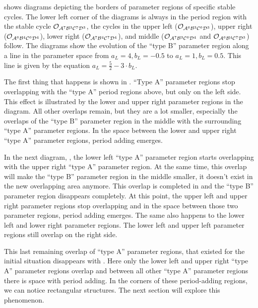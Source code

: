  shows diagrams depicting the borders of parameter regions of specific stable cycles.
The lower left corner of the diagrams is always in the period region with the stable cycle $\mathcal{O}_{\mathcal{A}^7\mathcal{B}^3\mathcal{C}^7\mathcal{D}^3}$, the cycles in the upper left ($\mathcal{O}_{\mathcal{A}^6\mathcal{B}^3\mathcal{C}^6\mathcal{D}^3}$), upper right ($\mathcal{O}_{\mathcal{A}^6\mathcal{B}^4\mathcal{C}^6\mathcal{D}^4}$), lower right ($\mathcal{O}_{\mathcal{A}^7\mathcal{B}^4\mathcal{C}^7\mathcal{D}^4}$), and middle ($\mathcal{O}_{\mathcal{A}^7\mathcal{B}^3\mathcal{C}^6\mathcal{D}^4}$ and $\mathcal{O}_{\mathcal{A}^6\mathcal{B}^4\mathcal{C}^7\mathcal{D}^3}$) follow.
The diagrams show the evolution of the ``type B'' parameter region along a line in the parameter space from $a_L = 4, b_L = -0.5$ to $a_L = 1, b_L = 0.5$.
This line is given by the equation $a_L = \frac{5}{2} - 3 \cdot b_L$.

The first thing that happens is shown in .
``Type A'' parameter regions stop overlapping with the ``type A'' period regions above, but only on the left side.
This effect is illustrated by the lower and upper right parameter regions in the diagram.
All other overlaps remain, but they are a lot smaller, especially the overlaps of the ``type B'' parameter region in the middle with the surrounding ``type A'' parameter regions.
In the space between the lower and upper right ``type A'' parameter regions, period adding emerges.

In the next diagram, , the lower left ``type A'' parameter region starts overlapping with the upper right ``type A'' parameter region.
At the same time, this overlap will make the ``type B'' parameter region in the middle smaller, it doesn't exist in the new overlapping area anymore.
This overlap is completed in  and the ``type B'' parameter region disappears completely.
At this point, the upper left and upper right parameter regions stop overlapping and in the space between those two parameter regions, period adding emerges.
The same also happens to the lower left and lower right parameter regions.
The lower left and upper left parameter regions still overlap on the right side.

This last remaining overlap of ``type A'' parameter regions, that existed for the initial situation disappears with .
Here only the lower left and upper right ``type A'' parameter regions overlap and between all other ``type A'' parameter regions there is space with period adding.
In the corners of these period-adding regions, we can notice rectangular structures.
The next section will explore this phenomenon.



